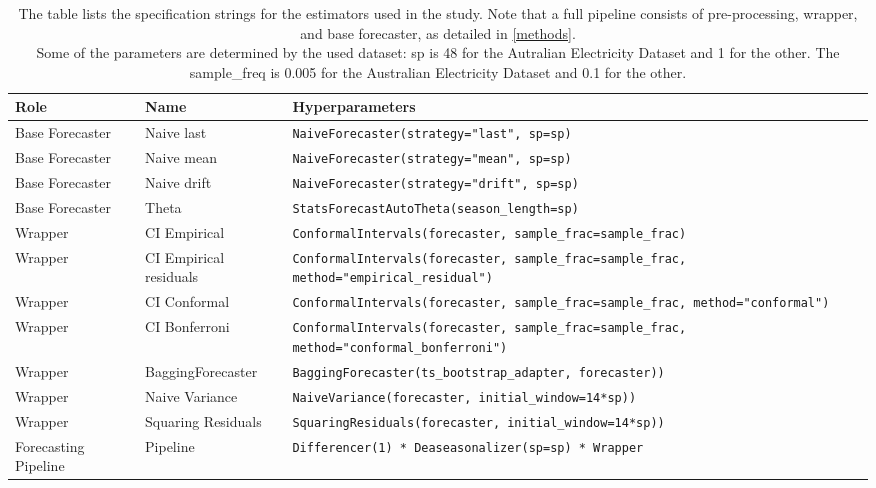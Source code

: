 \begin{table}[]
    \centering    \caption{
    The table lists the specification strings for the estimators used in the study. Note that a full pipeline consists of pre-processing, wrapper, and base forecaster, as detailed in \autoref{methods}. \\
    Some of the parameters are determined by the used dataset: sp is 48 for the Autralian Electricity Dataset and 1 for the other. The sample\_freq is 0.005 for the Australian Electricity Dataset and 0.1 for the other.\\}
    \label{tab:hyperparams}
    \footnotesize
    \begin{tabular}{p{2.5cm}p{4cm}|p{7.5cm}}
    \toprule
         Role & Name &  Hyperparameters \\ \midrule
         Base Forecaster & Naive last &  \texttt{NaiveForecaster(strategy="last", sp=sp)}\\
         Base Forecaster &  Naive mean &  \texttt{NaiveForecaster(strategy="mean", sp=sp)}\\
         Base Forecaster & Naive drift &  \texttt{NaiveForecaster(strategy="drift", sp=sp)}\\
         Base Forecaster & Theta &   \texttt{StatsForecastAutoTheta(season\_length=sp)} \\ \midrule
         Wrapper & CI Empirical & \texttt{ConformalIntervals(forecaster, sample\_frac=sample\_frac)} \\
         Wrapper & CI Empirical residuals & \texttt{ConformalIntervals(forecaster, sample\_frac=sample\_frac, method="empirical\_residual")} \\
         Wrapper & CI Conformal & \texttt{ConformalIntervals(forecaster, sample\_frac=sample\_frac, method="conformal")} \\
         Wrapper & CI Bonferroni & \texttt{ConformalIntervals(forecaster, sample\_frac=sample\_frac, method="conformal\_bonferroni")} \\
         Wrapper & BaggingForecaster & \texttt{BaggingForecaster(ts\_bootstrap\_adapter, forecaster))} \\
         Wrapper & Naive Variance & \texttt{NaiveVariance(forecaster, initial\_window=14*sp))}\\
         Wrapper & Squaring Residuals & \texttt{SquaringResiduals(forecaster, initial\_window=14*sp))}  \\ \midrule
         Forecasting Pipeline & Pipeline & \texttt{Differencer(1) * Deaseasonalizer(sp=sp) * Wrapper} \\ \midrule


\end{tabular}
\end{table}
